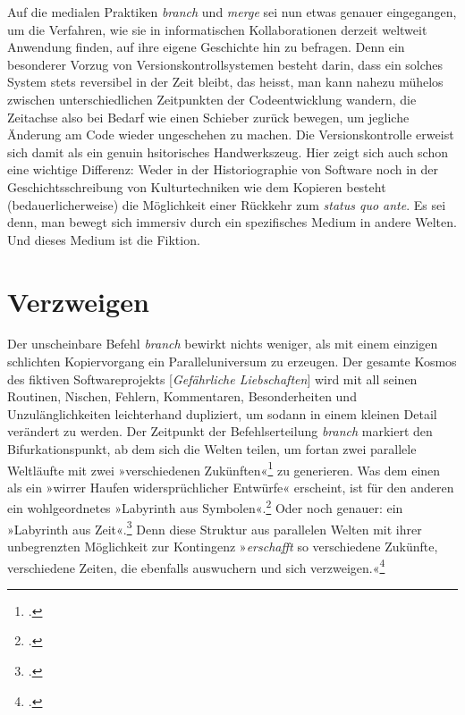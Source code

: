 \documentclass[a4paper,11pt]{article}
\newcommand{\anf}[1]{»#1«}
\begin{document}
Auf die medialen Praktiken \emph{branch} und \emph{merge} sei nun etwas genauer eingegangen, um die Verfahren, wie sie in informatischen Kollaborationen derzeit weltweit Anwendung finden, auf ihre eigene Geschichte hin zu befragen. Denn ein besonderer Vorzug von Versionskontrollsystemen besteht darin, dass ein solches System stets reversibel in der Zeit bleibt, das heisst, man kann nahezu mühelos zwischen unterschiedlichen Zeitpunkten der Codeentwicklung wandern, die Zeitachse also bei Bedarf wie einen Schieber zurück bewegen, um jegliche Änderung am Code wieder ungeschehen zu machen. Die Versionskontrolle erweist sich damit als ein genuin hsitorisches Handwerkszeug. Hier zeigt sich auch schon eine wichtige Differenz: Weder in der Historiographie von Software noch in der Geschichtsschreibung von Kulturtechniken wie dem Kopieren besteht (bedauerlicherweise) die Möglichkeit einer Rückkehr zum \emph{status quo ante}. Es sei denn, man bewegt sich immersiv durch ein spezifisches Medium in andere Welten. Und dieses Medium ist die Fiktion.

\section{Verzweigen}


Der unscheinbare Befehl \emph{branch} bewirkt nichts weniger, als mit einem einzigen schlichten Kopiervorgang ein Paralleluniversum zu erzeugen. Der gesamte Kosmos des fiktiven Softwareprojekts [\emph{Gefährliche Liebschaften}] wird mit all seinen Routinen, Nischen, Fehlern, Kommentaren, Besonderheiten und Unzulänglichkeiten leichterhand dupliziert, um sodann in einem kleinen Detail verändert zu werden. Der Zeitpunkt der Befehlserteilung \emph{branch} markiert den Bifurkationspunkt, ab dem sich die Welten teilen, um fortan zwei parallele Weltläufte mit zwei \anf{verschiedenen Zukünften}\footcite[169]{borges:1941} zu generieren. Was dem einen als ein \anf{wirrer Haufen widersprüchlicher Entwürfe} erscheint, ist für den anderen ein wohlgeordnetes \anf{Labyrinth aus Symbolen}.\footcite[168]{borges:1941} Oder noch genauer: ein \anf{Labyrinth aus Zeit}.\footcite[168]{borges:1941} Denn diese Struktur aus parallelen Welten mit ihrer unbegrenzten Möglichkeit zur Kontingenz \anf{\emph{erschafft} so verschiedene Zukünfte, verschiedene Zeiten, die ebenfalls auswuchern und sich verzweigen.}\footcite[170]{borges:1941} 
\end{document}
